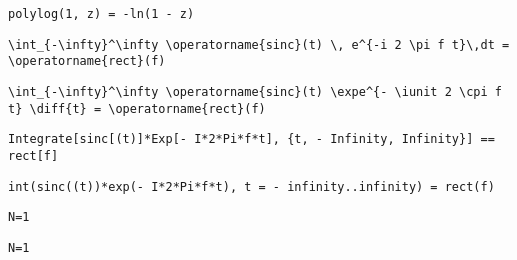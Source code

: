\newsavebox\BCMA
\begin{lrbox}{\BCMA}
 \begin{minipage}[t]{0.82\textwidth}
  \lstinline[language={[latex]TeX},mathescape,breaklines=true]"polylog(1, z) = -ln(1 - z)"
 \end{minipage}
\end{lrbox}
\newsavebox\BDT
\begin{lrbox}{\BDT}
 \begin{minipage}[t]{0.82\textwidth}
  \lstinline[language={[latex]TeX},mathescape,breaklines=true]"\int_{-\infty}^\infty \operatorname{sinc}(t) \, e^{-i 2 \pi f t}\,dt = \operatorname{rect}(f)"
 \end{minipage}
\end{lrbox}
\newsavebox\BDST
\begin{lrbox}{\BDST}
 \begin{minipage}[t]{0.82\textwidth}
  \lstinline[language={[latex]TeX},mathescape,breaklines=true]"\int_{-\infty}^\infty \operatorname{sinc}(t) \expe^{- \iunit 2 \cpi f t} \diff{t} = \operatorname{rect}(f)"
 \end{minipage}
\end{lrbox}
\newsavebox\BDMM
\begin{lrbox}{\BDMM}
 \begin{minipage}[t]{0.82\textwidth}
  \lstinline[language={[latex]TeX},mathescape,breaklines=true]"Integrate[sinc[(t)]*Exp[- I*2*Pi*f*t], {t, - Infinity, Infinity}] == rect[f]"
 \end{minipage}
\end{lrbox}
\newsavebox\BDMA
\begin{lrbox}{\BDMA}
 \begin{minipage}[t]{0.82\textwidth}
  \lstinline[language={[latex]TeX},mathescape,breaklines=true]"int(sinc((t))*exp(- I*2*Pi*f*t), t = - infinity..infinity) = rect(f)"
 \end{minipage}
\end{lrbox}
\newsavebox\BET
\begin{lrbox}{\BET}
 \begin{minipage}[t]{0.82\textwidth}
  \lstinline[language={[latex]TeX},mathescape,breaklines=true]"N=1"
 \end{minipage}
\end{lrbox}
\newsavebox\BEST
\begin{lrbox}{\BEST}
 \begin{minipage}[t]{0.82\textwidth}
  \lstinline[language={[latex]TeX},mathescape,breaklines=true]"N=1"
 \end{minipage}
\end{lrbox}
